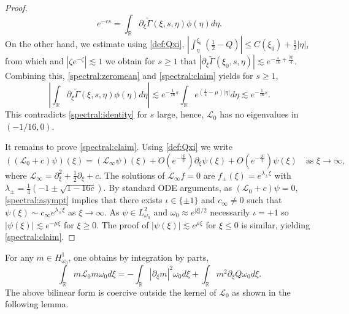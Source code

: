 \documentclass[11pt]{aims}
\theoremstyle{definition}
\newcommand{\Ls}{\mathscr{L}}
\newcommand{\pa}{\partial}
\newcommand{\be}{\begin{equation}}
\newcommand{\ee}{\end{equation}}
\numberwithin{equation}{section}
\begin{document}
\begin{proof}
\be \label{spectral:identity}
e^{-c s}=\int_{\mathbb R} \pa_\xi \tilde \Gamma(\xi,s,\eta) \phi(\eta)d\eta.
\ee
On the other hand,  we estimate using \eqref{def:Qxi},  $|\int_\eta^{\xi_0}(\frac 12-Q)|\leq C(\xi_0)+\frac 12 |\eta|$, from which and $|\zeta e^{-\zeta}|\lesssim 1$ we obtain for $s\geq 1$ that $|\pa_\xi \tilde \Gamma (\xi_0,s,\eta)|\lesssim e^{-\frac{s}{16}+\frac{|\eta|}{4}}$. Combining this, \eqref{spectral:zeromean} and \eqref{spectral:claim} yields for $s\geq 1$,
$$
\left| \int_{\mathbb R} \pa_\xi \tilde \Gamma(\xi,s,\eta) \phi(\eta)d\eta \right|\lesssim e^{-\frac{1}{16}s}\int_{\mathbb R} e^{(\frac 14-\mu )|\eta|}d\eta \lesssim e^{-\frac{1}{16}s}.
$$
This contradicts \eqref{spectral:identity} for $s$ large, hence, $\Ls_0$ has no eigenvalues in $(-1/16,0)$.

It remains to prove \eqref{spectral:claim}. Using \eqref{def:Qxi} we write
\be \label{spectral:asympt}
((\Ls_0+c)\psi)(\xi)=(\Ls_\infty \psi)(\xi)+O(e^{-\frac{|\xi|}{2}})\pa_\xi \psi(\xi)+O(e^{-\frac{|\xi|}{2}})\psi(\xi) \quad \mbox{as }\xi\to \infty,
\ee
where $\Ls_\infty=\pa_\xi^2+\frac 12 \pa_\xi +c$. The solutions of $\Ls_\infty f=0$ are $f_\pm (\xi)=e^{\lambda_\pm \xi}$ with $\lambda_\pm =\frac 14 (-1\pm \sqrt{1-16 c})$. By standard ODE arguments, as $(\Ls_0+c)\psi=0$, \eqref{spectral:asympt} implies that there exists $\iota \in \{\pm 1\}$ and $c_\infty \neq 0$ such that $\psi(\xi)\sim c_\infty e^{\lambda_\pm \xi}$ as $\xi \to \infty$. As $\psi\in L^2_{\omega_0}$ and $\omega_0 \approx e^{|\xi|/2}$ necessarily $\iota=+1$ so $|\psi(\xi)|\lesssim e^{-\mu \xi}$ for $\xi \geq 0$. The proof of $|\psi(\xi)|\lesssim e^{\mu \xi}$ for $\xi \leq 0$ is similar, yielding \eqref{spectral:claim}.
\end{proof}




For any $m \in H^1_{\omega_0}$,  one obtains by integration by parts,
\be \label{id:formulamLsm}
\int_{\mathbb R} m \Ls_0 m \omega_0d\xi=- \int_{\mathbb R} |\pa_\xi m|^2 \omega_0d\xi+\int_{\mathbb R}m^2 \pa_\xi Q \omega_0d\xi.
\ee
The above bilinear form is coercive outside the kernel of $\Ls_0$ as shown in the following lemma.
\end{document}
